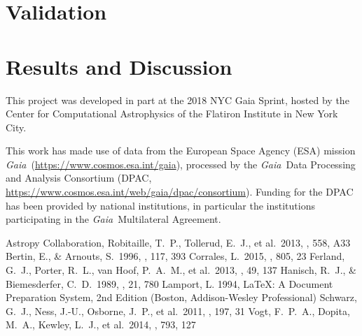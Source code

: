 \documentclass[modern]{aastex62}
\newcommand{\acronym}[1]{{\small{#1}}}
\newcommand{\project}[1]{\textsl{#1}}
\newcommand{\gaia}{\project{Gaia}}
\begin{document}
\section{Validation}

\section{Results and Discussion}

\acknowledgements
This project was developed in part at the
2018 \acronym{NYC} Gaia Sprint, hosted by the Center for Computational Astrophysics of
the Flatiron Institute in New York City.

This work has made use of data from the European Space Agency (ESA) mission
\gaia\ (\url{https://www.cosmos.esa.int/gaia}), processed by the \gaia\ Data
Processing and Analysis Consortium (\acronym{DPAC},
\url{https://www.cosmos.esa.int/web/gaia/dpac/consortium}). Funding for the
\acronym{DPAC}
has been provided by national institutions, in particular the institutions
participating in the \gaia\ Multilateral Agreement.

\begin{thebibliography}{}

 Astropy Collaboration, Robitaille, T.~P., Tollerud, E.~J., et al.\ 2013, \aap, 558, A33 
 Bertin, E., \& Arnouts, S.\ 1996, \aaps, 117, 393 
 Corrales, L.\ 2015, \apj, 805, 23
 Ferland, G.~J., Porter, R.~L., van Hoof, P.~A.~M., et al.\ 2013, \rmxaa, 49, 137
 Hanisch, R.~J., \& Biemesderfer, C.~D.\ 1989, \baas, 21, 780 
 Lamport, L. 1994, LaTeX: A Document Preparation System, 2nd Edition (Boston, Addison-Wesley Professional)
 Schwarz, G.~J., Ness, J.-U., Osborne, J.~P., et al.\ 2011, \apjs, 197, 31  
 Vogt, F.~P.~A., Dopita, M.~A., Kewley, L.~J., et al.\ 2014, \apj, 793, 127  

\end{thebibliography}


\end{document}
